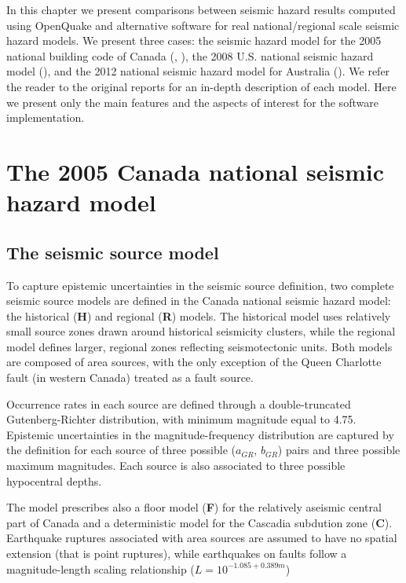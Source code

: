 In this chapter we present comparisons between seismic hazard results computed using OpenQuake and alternative software for real national/regional scale seismic hazard models. We present three cases: the seismic hazard model for the 2005 national building code of Canada (\cite{adams2003}, \cite{halchuk2008}), the 2008 U.S. national seismic hazard model (\cite{petersen2008}), and the 2012 national seismic hazard model for Australia (\cite{burbidge2012}). We refer the reader to the original reports for an in-depth description of each model. Here we present only the main features and the aspects of interest for the software implementation.


\section{The 2005 Canada national seismic hazard model}

\subsection{The seismic source model}
To capture epistemic uncertainties in the seismic source definition, two complete seismic source models are defined in the Canada national seismic hazard model: the historical (\textbf{H}) and regional (\textbf{R}) models. The historical model uses relatively small source zones drawn around historical seismicity clusters, while the regional model defines larger, regional zones reflecting seismotectonic units. Both models are composed of area sources, with the only exception of the Queen Charlotte fault (in western Canada) treated as a fault source. 

Occurrence rates in each source are defined through a double-truncated Gutenberg-Richter distribution, with minimum magnitude equal to 4.75. Epistemic uncertainties in the magnitude-frequency distribution are captured by the definition for each source of three possible ($a_{GR}$, $b_{GR}$) pairs and three possible maximum magnitudes. Each source is also associated to three possible hypocentral depths.

The model prescribes also a floor model (\textbf{F}) for the relatively aseismic central part of Canada and a deterministic model for the Cascadia subdution zone (\textbf{C}). Earthquake ruptures associated with area sources are assumed to have no spatial extension (that is point ruptures), while earthquakes on faults follow a magnitude-length scaling relationship ($L=10^{-1.085 + 0.389 m}$)

